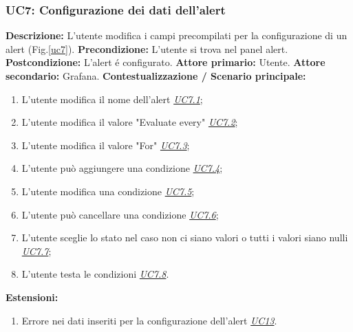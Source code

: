                 \subsubsection{UC7: Configurazione dei dati dell'alert}
                    \textbf{Descrizione:} L’utente modifica i campi precompilati per la configurazione di un alert (Fig.\ref{uc7}).
                    \newline
                    \textbf{Precondizione:} L'utente si trova nel panel alert.
                    \newline
                    \textbf{Postcondizione:} L'alert é configurato.
                    \newline
                    \textbf{Attore primario:} Utente.
                    \newline
                    \textbf{Attore secondario:} Grafana.
                    \newline
                    \textbf{Contestualizzazione / Scenario principale:} \begin{enumerate}
                            \item L’utente modifica il nome dell'alert \underline{\textit{UC7.1}};
                            \item L'utente modifica il valore "Evaluate every" \underline{\textit{UC7.2}};
                            \item L'utente modifica il valore "For" \underline{\textit{UC7.3}};
                            \item L'utente può aggiungere una condizione \underline{\textit{UC7.4}};
                            \item L'utente modifica una condizione \underline{\textit{UC7.5}};
                            \item L'utente può cancellare una condizione \underline{\textit{UC7.6}};
                            \item L'utente sceglie lo stato nel caso non ci siano valori o tutti i valori siano nulli \underline{\textit{UC7.7}};
                            \item L'utente testa le condizioni \underline{\textit{UC7.8}}.
                        \end{enumerate}
                        
                \textbf{Estensioni:} 
                    \begin{enumerate}
                            \item Errore nei dati inseriti per la configurazione dell'alert \underline{\textit{UC13}}.
                        \end{enumerate}
        
